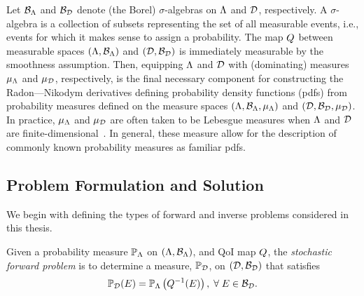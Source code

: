 Let $\mathcal{B}_{{\Lambda}}$ and $\mathcal{B}_{\mathcal{D}}$ denote (the Borel) $\sigma$-algebras on ${\Lambda}$ and $\mathcal{D}$, respectively.
A $\sigma$-algebra is a collection of subsets representing the set of all measurable events, i.e., events for which it makes sense to assign a probability.
The map $Q$ between measurable spaces $({\Lambda}, \mathcal{B}_{{\Lambda}})$ and $(\mathcal{D}, \mathcal{B}_{\mathcal{D}})$ is immediately measurable by the smoothness assumption.
Then, equipping ${\Lambda}$ and $\mathcal{D}$ with (dominating) measures $\mu_{{\Lambda}}$ and $\mu_{\mathcal{D}}$, respectively, is the final necessary component for constructing the Radon---Nikodym derivatives defining probability density functions (pdfs) from probability measures defined on the measure spaces $({\Lambda}, \mathcal{B}_{{\Lambda}}, \mu_{{\Lambda}})$ and $(\mathcal{D}, \mathcal{B}_{\mathcal{D}}, \mu_{\mathcal{D}})$.
In practice, $\mu_{{\Lambda}}$ and $\mu_{\mathcal{D}}$ are often taken to be Lebesgue measures when ${\Lambda}$ and $\mathcal{D}$ are finite-dimensional~\cite{BET+14, BJW18a}.
In general, these measure allow for the description of commonly known probability measures as familiar pdfs.

\subsection{Problem Formulation and Solution}
We begin with defining the types of forward and inverse problems considered in this thesis.

\begin{defn}\label{defn:forward-problem}
  Given a probability measure $\mathbb{P}_{\Lambda}$ on $({\Lambda}, \mathcal{B}_{{\Lambda}})$, and QoI map $Q$, the \emph{stochastic forward problem} is to determine a measure, $\mathbb{P}_{\mathcal{D}}$, on $(\mathcal{D}, \mathcal{B}_{\mathcal{D}})$ that satisfies
  \begin{equation}\label{eq:forward-problem}
    \mathbb{P}_{\mathcal{D}} (E) = \mathbb{P}_{\Lambda} \left ( Q^{-1}(E) \right ), \; \forall \; E \in \mathcal{B}_{\mathcal{D}}.
  \end{equation}
\end{defn}

